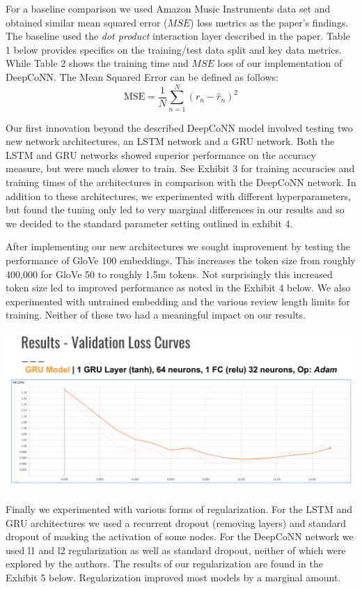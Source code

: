 \documentclass[10pt,twocolumn,letterpaper]{article}
\begin{document}
For a baseline comparison we used Amazon Music Instruments data set and obtained similar mean squared error ($MSE$) loss metrics as the paper's findings. The baseline used the \textit{dot product} interaction layer described in the paper. Table 1 below provides specifics on the training/test data split and key data metrics. While Table 2 shows the training time and $MSE$ loss of our implementation of DeepCoNN. The Mean Squared Error can be defined as follows:
$$
\mbox{MSE} = \frac{1}{N}\sum_{n=1}^{N}(r_{n} - \hat{r}_{n})^2
$$

Our first innovation beyond the described DeepCoNN model involved testing two new network architectures, an LSTM network and a GRU network. Both the LSTM and GRU networks showed superior performance on the accuracy measure, but were much slower to train. See Exhibit 3 for training accuracies and training times of the architectures in comparison with the DeepCoNN network.  In addition to these architectures, we experimented with different hyperparameters, but found the tuning only led to very marginal differences in our results and so we decided to the standard parameter setting outlined in exhibit 4. 

After implementing our new architectures we sought improvement by testing the performance of GloVe 100 embeddings. This increases the token size from roughly 400,000 for GloVe 50 to roughly 1.5m tokens. Not surprisingly this increased token size led to improved performance as noted in the Exhibit 4 below. We also experimented with untrained embedding and the various review length limits for training. Neither of these two had a meaningful impact on our results.  

\includegraphics[scale=0.38]{Loss_Graph.png}

Finally we experimented with various forms of regularization. For the LSTM and GRU architectures we used a recurrent dropout (removing layers) and standard dropout of masking the activation of some nodes. For the DeepCoNN network we used l1 and l2 regularization as well as standard dropout, neither of which were explored by the authors. The results of our regularization are found in the Exhibit 5 below. Regularization improved most models by a marginal amount.  
\end{document}
